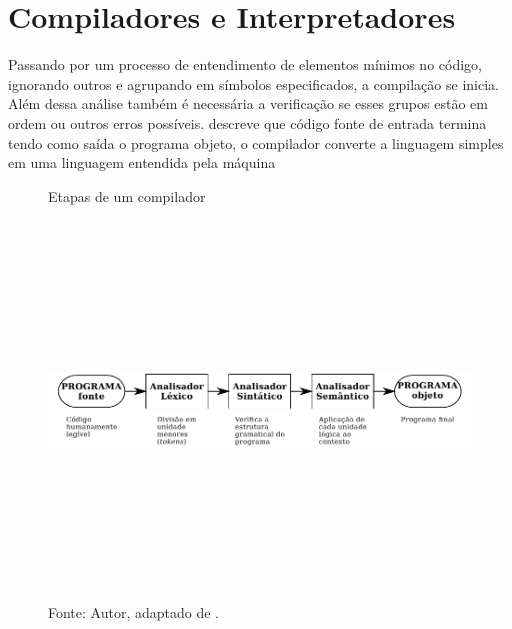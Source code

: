 \section{Compiladores e Interpretadores}


Passando por um processo de entendimento de elementos mínimos no código, ignorando outros e agrupando em símbolos especificados, a compilação se inicia. Além dessa análise também é necessária a verificação se esses grupos estão em ordem ou outros erros possíveis.  descreve que código fonte de entrada termina tendo como saída o programa objeto, o compilador converte a linguagem simples em uma linguagem entendida pela máquina

\begin{figure}[h]
  \caption{\ifdraft{\color{green}}{}Etapas de um compilador}\label{fig:compilador}
  \centering
\includegraphics[width=\textwidth,height=10cm,keepaspectratio]{figures/etapas-compilador.pdf}
  \caption*{\ifdraft{\color{green}}{}\footnotesize Fonte: Autor, adaptado de .}
\end{figure}

